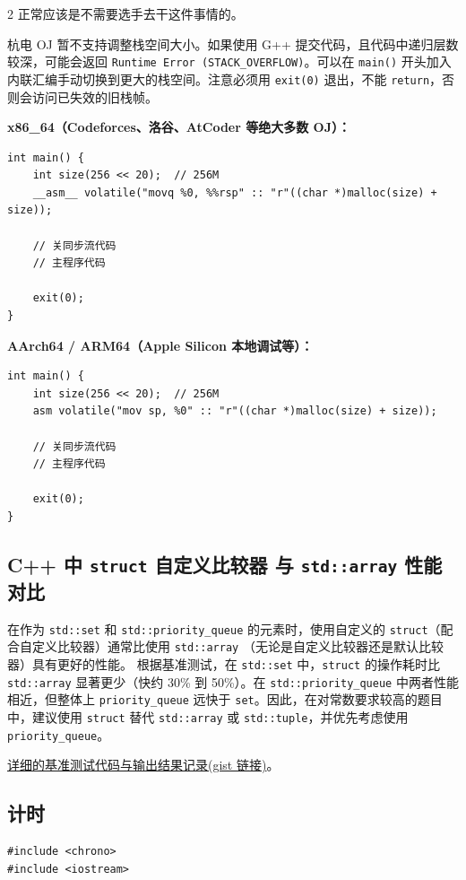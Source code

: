 \begin{multicols*}{2}
	正常应该是不需要选手去干这件事情的。

	杭电 OJ 暂不支持调整栈空间大小。如果使用 G++ 提交代码，且代码中递归层数较深，可能会返回 \texttt{Runtime Error (STACK\_OVERFLOW)}。可以在 \texttt{main()} 开头加入内联汇编手动切换到更大的栈空间。注意必须用 \texttt{exit(0)} 退出，不能 \texttt{return}，否则会访问已失效的旧栈帧。

	\textbf{x86\_64（Codeforces、洛谷、AtCoder 等绝大多数 OJ）：}

	\begin{verbatim}
int main() {
    int size(256 << 20);  // 256M
    __asm__ volatile("movq %0, %%rsp" :: "r"((char *)malloc(size) + size));

    // 关同步流代码
    // 主程序代码

    exit(0);
}
	\end{verbatim}

	\textbf{AArch64 / ARM64（Apple Silicon 本地调试等）：}

	\begin{verbatim}
int main() {
    int size(256 << 20);  // 256M
    asm volatile("mov sp, %0" :: "r"((char *)malloc(size) + size));

    // 关同步流代码
    // 主程序代码

    exit(0);
}
	\end{verbatim}

	\subsection{C++ 中 \texttt{struct} 自定义比较器 与 \texttt{std::array} 性能对比}
	在作为 \texttt{std::set} 和 \texttt{std::priority\_queue} 的元素时，使用自定义的 \texttt{struct}（配合自定义比较器）通常比使用 \texttt{std::array} （无论是自定义比较器还是默认比较器）具有更好的性能。
	根据基准测试，在 \texttt{std::set} 中，\texttt{struct} 的操作耗时比 \texttt{std::array} 显著更少（快约 30\% 到 50\%）。在 \texttt{std::priority\_queue} 中两者性能相近，但整体上 \texttt{priority\_queue} 远快于 \texttt{set}。因此，在对常数要求较高的题目中，建议使用 \texttt{struct} 替代 \texttt{std::array} 或 \texttt{std::tuple}，并优先考虑使用 \texttt{priority\_queue}。

	\href{https://gist.github.com/znzryb/bfc064b51520410569d562619ac0af11}{详细的基准测试代码与输出结果记录(gist 链接)}。

	\subsection{计时}
	\begin{verbatim}
#include <chrono>
#include <iostream>


\end{verbatim}
\end{multicols*}
